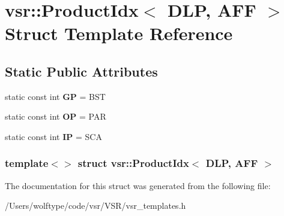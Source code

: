 \hypertarget{structvsr_1_1_product_idx_3_01_d_l_p_00_01_a_f_f_01_4}{\section{vsr\-:\-:Product\-Idx$<$ D\-L\-P, A\-F\-F $>$ Struct Template Reference}
\label{structvsr_1_1_product_idx_3_01_d_l_p_00_01_a_f_f_01_4}
}
\subsection*{Static Public Attributes}
\begin{DoxyCompactItemize}
\item 
\hypertarget{structvsr_1_1_product_idx_3_01_d_l_p_00_01_a_f_f_01_4_a16f9036e986789bd5b97633e2b6ad650}{static const int {\bfseries G\-P} = B\-S\-T}\label{structvsr_1_1_product_idx_3_01_d_l_p_00_01_a_f_f_01_4_a16f9036e986789bd5b97633e2b6ad650}

\item 
\hypertarget{structvsr_1_1_product_idx_3_01_d_l_p_00_01_a_f_f_01_4_a4ebcbf546a68a8fe2385d2494e24f12b}{static const int {\bfseries O\-P} = P\-A\-R}\label{structvsr_1_1_product_idx_3_01_d_l_p_00_01_a_f_f_01_4_a4ebcbf546a68a8fe2385d2494e24f12b}

\item 
\hypertarget{structvsr_1_1_product_idx_3_01_d_l_p_00_01_a_f_f_01_4_a737143c22ae3aa47654c438529e3b627}{static const int {\bfseries I\-P} = S\-C\-A}\label{structvsr_1_1_product_idx_3_01_d_l_p_00_01_a_f_f_01_4_a737143c22ae3aa47654c438529e3b627}

\end{DoxyCompactItemize}
\subsubsection*{template$<$$>$ struct vsr\-::\-Product\-Idx$<$ D\-L\-P, A\-F\-F $>$}



The documentation for this struct was generated from the following file\-:\begin{DoxyCompactItemize}
\item 
/\-Users/wolftype/code/vsr/\-V\-S\-R/vsr\-\_\-templates.\-h\end{DoxyCompactItemize}
